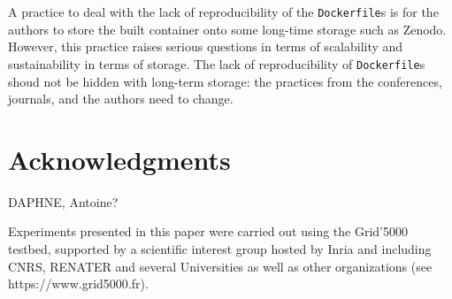 \documentclass[sigconf,natbib=false]{acmart}
\newcommand{\df}{\texttt{Dockerfile}}
\begin{document}
A practice to deal with the lack of reproducibility of the \df s is for the authors to store the built container onto some long-time storage such as Zenodo.
However, this practice raises serious questions in terms of scalability and sustainability in terms of storage.
The lack of reproducibility of \df s shoud not be hidden with long-term storage: the practices from the conferences, journals, and the authors need to change.

%

\section*{Acknowledgments}

DAPHNE, Antoine?

Experiments presented in this paper were carried out using the Grid'5000 testbed, supported by a scientific interest group hosted by Inria and including CNRS, RENATER and several Universities as well as other organizations (see https://www.grid5000.fr). 


\newpage
\newpage
%
%
\printbibliography
\end{document}
